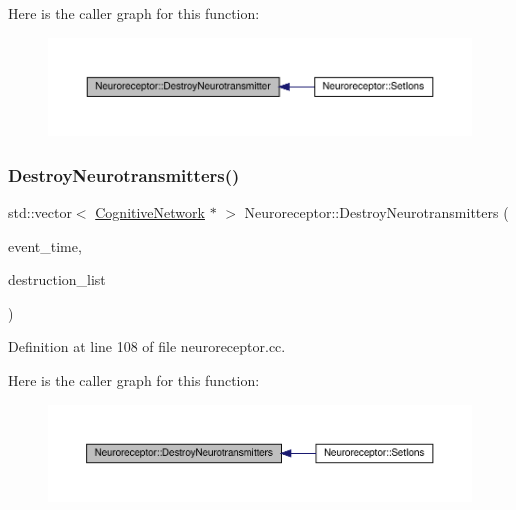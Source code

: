 Here is the caller graph for this function\+:\nopagebreak
\begin{figure}[H]
\begin{center}
\leavevmode
\includegraphics[width=350pt]{class_neuroreceptor_a35beb8e355f9b567b327e9323f5552a0_icgraph}
\end{center}
\end{figure}
\mbox{\label{class_neuroreceptor_acd500abfb25bd08167b2002e85e8b788}} 
\subsubsection{\texorpdfstring{Destroy\+Neurotransmitters()}{DestroyNeurotransmitters()}}
{\footnotesize\ttfamily std\+::vector$<$ \hyperlink{class_cognitive_network}{Cognitive\+Network} $\ast$ $>$ Neuroreceptor\+::\+Destroy\+Neurotransmitters (\begin{DoxyParamCaption}\item[{std\+::chrono\+::time\+\_\+point$<$ \hyperlink{universe_8h_a0ef8d951d1ca5ab3cfaf7ab4c7a6fd80}{Clock} $>$}]{event\+\_\+time,  }\item[{std\+::vector$<$ \hyperlink{class_cognitive_network}{Cognitive\+Network} $\ast$$>$}]{destruction\+\_\+list }\end{DoxyParamCaption})}



Definition at line 108 of file neuroreceptor.\+cc.

Here is the caller graph for this function\+:\nopagebreak
\begin{figure}[H]
\begin{center}
\leavevmode
\includegraphics[width=350pt]{class_neuroreceptor_acd500abfb25bd08167b2002e85e8b788_icgraph}
\end{center}
\end{figure}
\mbox{\label{class_neuroreceptor_a4a49cfc2f741d7f7b7888929651f7be3}} 

